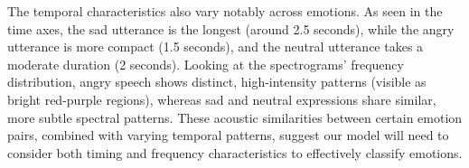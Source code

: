 \documentclass[../main.tex]{subfiles}
\begin{document}
The temporal characteristics also vary notably across emotions. As seen in the 
time axes, the sad utterance is the longest (around 2.5 seconds), while the 
angry utterance is more compact (1.5 seconds), and the neutral utterance takes 
a moderate duration (2 seconds). Looking at the spectrograms' frequency 
distribution, angry speech shows distinct, high-intensity patterns 
(visible as bright red-purple regions), whereas sad and neutral expressions 
share similar, more subtle spectral patterns. These acoustic similarities 
between certain emotion pairs, combined with varying temporal patterns, 
suggest our model will need to consider both timing and frequency 
characteristics to effectively classify emotions.
\end{document}
